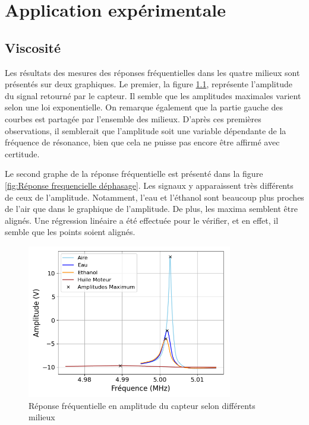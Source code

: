 \chapter{Application expérimentale}

\section{Viscosité}
Les résultats des mesures des réponses fréquentielles dans les quatre milieux sont présentés sur deux graphiques. Le premier, la figure \ref{fig:Réponse frequencielle amplitude}, représente l’amplitude du signal retourné par le capteur. Il semble que les amplitudes maximales varient selon une loi exponentielle. On remarque également que la partie gauche des courbes est partagée par l’ensemble des milieux. D’après ces premières observations, il semblerait que l’amplitude soit une variable dépendante de la fréquence de résonance, bien que cela ne puisse pas encore être affirmé avec certitude.

Le second graphe de la réponse fréquentielle est présenté dans la figure \ref{fig:Réponse frequencielle déphasage}. Les signaux y apparaissent très différents de ceux de l’amplitude. Notamment, l’eau et l’éthanol sont beaucoup plus proches de l’air que dans le graphique de l’amplitude. De plus, les maxima semblent être alignés. Une régression linéaire a été effectuée pour le vérifier, et en effet, il semble que les points soient alignés.


\begin{figure}[H]
    \centering
    \includegraphics[width=0.8\textwidth]{assets/figures/reponseFrequence.png}
    \caption{Réponse fréquentielle en amplitude du capteur selon différents milieux}
    \label{fig:Réponse frequencielle amplitude}
\end{figure}

